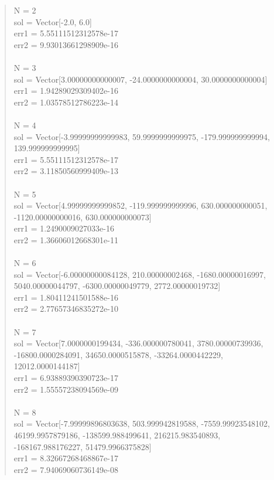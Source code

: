 \documentclass[letterpaper,12pt]{article}
\begin{document}
\begin{quote}
N = 2
\\sol = Vector[-2.0, 6.0]
\\err1 = 5.55111512312578e-17
\\err2 = 9.93013661298909e-16
\\
\\N = 3
\\sol = Vector[3.00000000000007, -24.0000000000004, 30.0000000000004]
\\err1 = 1.94289029309402e-16
\\err2 = 1.03578512786223e-14
\\
\\N = 4
\\sol = Vector[-3.99999999999983, 59.9999999999975, -179.999999999994, 139.999999999995]
\\err1 = 5.55111512312578e-17
\\err2 = 3.11850560999409e-13
\\
\\N = 5
\\sol = Vector[4.99999999999852, -119.999999999996, 630.000000000051, -1120.00000000016, 630.000000000073]
\\err1 = 1.2490009027033e-16
\\err2 = 1.36606012668301e-11
\\
\\N = 6
\\sol = Vector[-6.00000000084128, 210.00000002468, -1680.00000016997, 5040.00000044797, -6300.00000049779, 2772.00000019732]
\\err1 = 1.80411241501588e-16
\\err2 = 2.77657346835272e-10
\\
\\N = 7
\\sol = Vector[7.0000000199434, -336.000000780041, 3780.00000739936, -16800.0000284091, 34650.0000515878, -33264.0000442229, 12012.0000144187]
\\err1 = 6.93889390390723e-17
\\err2 = 1.55557238094569e-09
\\
\\N = 8
\\sol = Vector[-7.99999896803638, 503.999942819588, -7559.99923548102, 46199.9957879186, -138599.988499641, 216215.983540893, -168167.988176227, 51479.9966375828]
\\err1 = 8.32667268468867e-17
\\err2 = 7.94069060736149e-08
\\

\end{quote}
\end{document}
